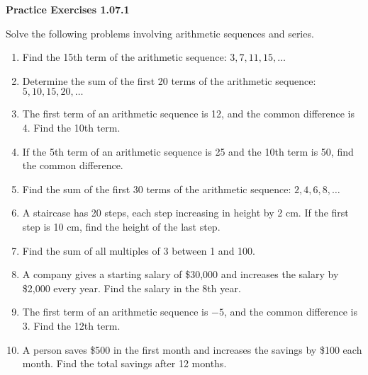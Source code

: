 \vspace{0.3ex}
\noindent\textbf{Practice Exercises 1.07.1}

\vspace{0.2ex}

Solve the following problems involving arithmetic sequences and series.
\begin{enumerate}
    \item Find the 15th term of the arithmetic sequence: \(3, 7, 11, 15, \dots\)
    \item Determine the sum of the first 20 terms of the arithmetic sequence: \(5, 10, 15, 20, \dots\)
    \item The first term of an arithmetic sequence is 12, and the common difference is 4. Find the 10th term.
    \item If the 5th term of an arithmetic sequence is 25 and the 10th term is 50, find the common difference.
    \item Find the sum of the first 30 terms of the arithmetic sequence: \(2, 4, 6, 8, \dots\)
    \item A staircase has 20 steps, each step increasing in height by 2 cm. If the first step is 10 cm, find the height of the last step.
    \item Find the sum of all multiples of 3 between 1 and 100.
    \item A company gives a starting salary of \$30,000 and increases the salary by \$2,000 every year. Find the salary in the 8th year.
    \item The first term of an arithmetic sequence is \( -5 \), and the common difference is \( 3 \). Find the 12th term.
    \item A person saves \$500 in the first month and increases the savings by \$100 each month. Find the total savings after 12 months.
\end{enumerate}
